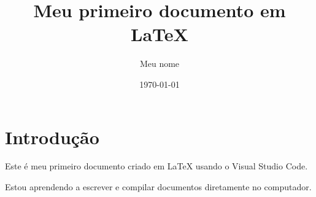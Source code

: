 \documentclass{article}
\title{Meu primeiro documento em LaTeX}
\author{Meu nome}
\date{\today}
\begin{document}
\maketitle

\section{Introdução}

Este é meu primeiro documento criado em LaTeX usando o Visual Studio Code.

Estou aprendendo a escrever e compilar documentos diretamente no computador.
\end{document}
